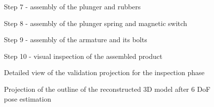 \begin{figure}[H]
	\begin{floatrow}[2]
		{\caption{Step 7 - assembly of the plunger and rubbers}\label{fig:step7}}
		{\caption{Step 8 - assembly of the plunger spring and magnetic switch}\label{fig:step8}}
	\end{floatrow}
\end{figure}

\begin{figure}[H]
	\begin{floatrow}[2]
		{\caption{Step 9 - assembly of the armature and its bolts}\label{fig:step9}}
		{\caption{Step 10 - visual inspection of the assembled product}\label{fig:step10}}
	\end{floatrow}
\end{figure}

\begin{figure}[H]
	\begin{floatrow}[2]
		{\caption{Detailed view of the validation projection for the inspection phase}\label{fig:projection-mapping-2}}
		{\caption{Projection of the outline of the reconstructed 3D model after 6 DoF pose estimation}\label{fig:projection-mapping-3}}
	\end{floatrow}
\end{figure}
